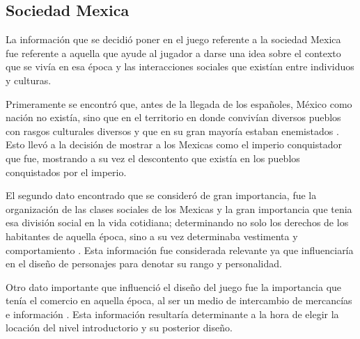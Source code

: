 	\subsection{Sociedad Mexica}
	La información que se decidió poner en el juego referente a la sociedad Mexica 
	fue referente a aquella que ayude al jugador a darse una idea sobre el contexto 
	que se vivía en esa época y las interacciones sociales que existían entre 
	individuos y culturas. 
	\\
	\par		
	Primeramente se encontró que, antes de la llegada de los españoles, México como 
	nación no existía, sino que en el territorio en donde convivían diversos pueblos 
	con rasgos culturales diversos y que en su gran mayoría estaban enemistados
	\cite{RefMexicasMito}. Esto llevó a la decisión de mostrar a los Mexicas como el 
	imperio conquistador que fue, mostrando a su vez el descontento que existía en los 
	pueblos conquistados por el imperio.
	\\
	\par
	 El segundo dato encontrado que se consideró de gran importancia, fue la 
	 organización de las clases sociales de los Mexicas y la gran importancia que 
	 tenia esa división social en la vida cotidiana; determinando no solo los 
	 derechos de los habitantes de aquella época, sino a su vez determinaba vestimenta 
	 y comportamiento \cite{RefCivilAztea}. Esta información fue considerada relevante 
	 ya que influenciaría en el diseño de personajes para denotar su rango y 
	 personalidad.
	 \\
	 \par
	 Otro dato importante que influenció el diseño del juego fue la importancia que 
	 tenía el comercio en aquella época, al ser un medio de intercambio de mercancías
	 e información \cite{RefMexicasMito}. Esta información resultaría determinante a la 
	 hora de elegir la locación del nivel introductorio y su posterior diseño.
	 
